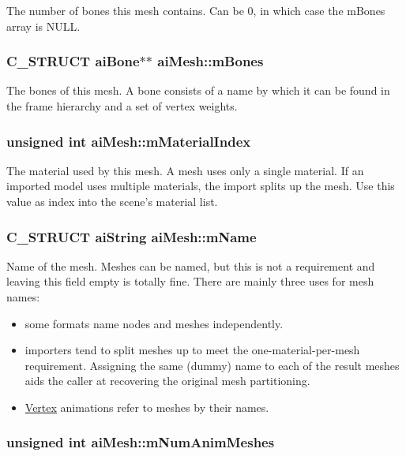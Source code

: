 The number of bones this mesh contains. Can be 0, in which case the mBones array is NULL. \hypertarget{structai_mesh_0c0582a7f45b340b6a33552c53232539}{
\subsubsection[mBones]{\setlength{\rightskip}{0pt plus 5cm}C\_\-STRUCT {\bf aiBone}$\ast$$\ast$ {\bf aiMesh::mBones}}}
\label{structai_mesh_0c0582a7f45b340b6a33552c53232539}


The bones of this mesh. A bone consists of a name by which it can be found in the frame hierarchy and a set of vertex weights. \hypertarget{structai_mesh_a2807c7ba172115203ed16047ad65f9e}{
\subsubsection[mMaterialIndex]{\setlength{\rightskip}{0pt plus 5cm}unsigned int {\bf aiMesh::mMaterialIndex}}}
\label{structai_mesh_a2807c7ba172115203ed16047ad65f9e}


The material used by this mesh. A mesh uses only a single material. If an imported model uses multiple materials, the import splits up the mesh. Use this value as index into the scene's material list. \hypertarget{structai_mesh_8dd9433e0c5b008e3e5aee6c801d3b74}{
\subsubsection[mName]{\setlength{\rightskip}{0pt plus 5cm}C\_\-STRUCT {\bf aiString} {\bf aiMesh::mName}}}
\label{structai_mesh_8dd9433e0c5b008e3e5aee6c801d3b74}


Name of the mesh. Meshes can be named, but this is not a requirement and leaving this field empty is totally fine. There are mainly three uses for mesh names:\begin{itemize}
\item some formats name nodes and meshes independently.\item importers tend to split meshes up to meet the one-material-per-mesh requirement. Assigning the same (dummy) name to each of the result meshes aids the caller at recovering the original mesh partitioning.\item \hyperlink{struct_vertex}{Vertex} animations refer to meshes by their names. \end{itemize}
\hypertarget{structai_mesh_1692a300222b32348ae51779df4a697e}{
\subsubsection[mNumAnimMeshes]{\setlength{\rightskip}{0pt plus 5cm}unsigned int {\bf aiMesh::mNumAnimMeshes}}}
\label{structai_mesh_1692a300222b32348ae51779df4a697e}


